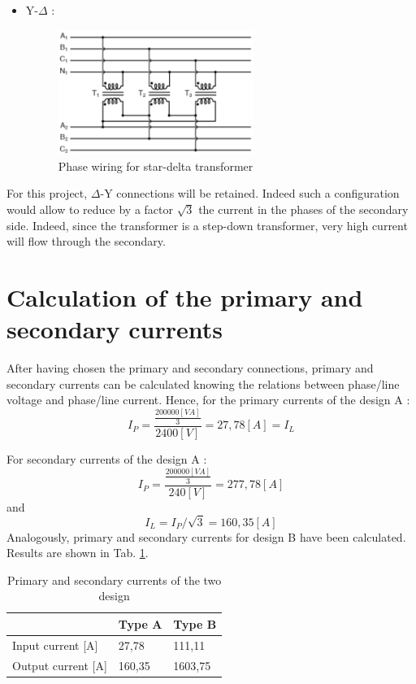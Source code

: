 \documentclass[12pt,a4paper]{report}
\begin{document}
\begin{itemize}
    \item Y-$\Delta$ :
       
    \begin{figure}[h]
    \centering
    \includegraphics[width=0.6\textwidth]{y-delta.PNG}
    \caption{Phase wiring for star-delta transformer}
    \label{fig:star-delta transformer}
    \end{figure}
\end{itemize}

For this project, $\Delta$-Y connections will be retained. Indeed such a configuration would allow to reduce by a factor $\sqrt{3}$ the current in the phases of the secondary side. Indeed, since the transformer is a step-down transformer, very high current will flow through the secondary.

\section{Calculation of the primary and secondary currents}
After having chosen the primary and secondary connections, primary and secondary currents can be calculated knowing the relations between phase/line voltage and phase/line current. Hence, for the primary currents of the design A :
\begin{equation}
    I_P = \frac{\frac{200000 [VA]}{3}}{2400[V]} = 27,78 [A] = I_L
\end{equation}

For secondary currents of the design A :
\begin{equation}
    I_P = \frac{\frac{200000 [VA]}{3}}{240 [V]} = 277,78 [A]
\end{equation}
and 
\begin{equation}
    I_L = I_P/\sqrt{3} = 160,35[A]
\end{equation}
Analogously, primary and secondary currents for design B have been calculated. Results are shown in Tab. \ref{tab:currents}.

\begin{table}[h]
    \centering
\begin{tabular}{|l|l|l|}
  \hline
   & \textbf{Type A} &\textbf{Type B}\\
  \hline
    Input current [A] & 27,78 & 111,11\\\hline
    Output current [A] & 160,35 & 1603,75\\\hline
\end{tabular}
    \caption{Primary and secondary currents of the two design}
    \label{tab:currents}
\end{table}
\end{document}
